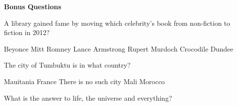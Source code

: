 \documentclass[10pt,answers,addpoints]{exam}
\begin{document}
\begin{questions}
\begin{minipage}{\linewidth}
\end{minipage}





\newpage
\begin{center}
{\Large \textbf{Bonus Questions}}
\end{center}

\par\vspace{0.100000in}\begin{minipage}{\linewidth}
\bonusquestion[2]
A library gained fame by moving which celebrity's book from non-fiction to fiction in 2012?
\medskip
\begin{choices}
\choice Beyonce
\choice Mitt Romney
\choice Lance Armstrong
\choice Rupert Murdoch
\choice Crocodile Dundee
\end{choices}
\setlength\answerlinelength{1in}
\answerline[C]

\end{minipage}


\par\vspace{0.100000in}\begin{minipage}{\linewidth}
\bonusquestion[2]
The city of Tumbuktu is in what country?
\medskip
\begin{choices}
\choice Mauitania
\choice France
\choice There is no such city
\choice Mali
\choice Morocco
\end{choices}
\setlength\answerlinelength{1in}
\answerline[D]

\end{minipage}


\par\vspace{0.100000in}\begin{minipage}{\linewidth}
\vspace{.35cm}\bonusquestion[2]
What is the answer to life, the universe and everything?
\vspace{.25cm}\setlength\answerlinelength{1in}
\answerline[42]
\end{minipage}





\end{questions}
\end{document}

